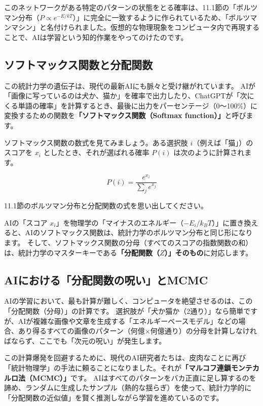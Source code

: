 このネットワークがある特定のパターンの状態をとる確率は、11.1節の「ボルツマン分布（\(P \propto e^{-E/kT}\)）」に完全に一致するように作られているため、「ボルツマンマシン」と名付けられました。仮想的な物理現象をコンピュータ内で再現することで、AIは学習という知的作業をやってのけたのです。

\subsection{ソフトマックス関数と分配関数}

この統計力学の遺伝子は、現代の最新AIにも脈々と受け継がれています。 AIが「画像に写っているのは犬か、猫か」を確率で出力したり、ChatGPTが「次にくる単語の確率」を計算するとき、最後に出力をパーセンテージ（0〜100\%）に変換するための関数を\textbf{「ソフトマックス関数（Softmax function）」}と呼びます。

ソフトマックス関数の数式を見てみましょう。ある選択肢 \(i\)（例えば「猫」）のスコアを \(x_i\) としたとき、それが選ばれる確率 \(P(i)\) は次のように計算されます。

\[
P(i) = \frac{e^{x_i}}{\sum_j e^{x_j}}
\]

11.1節のボルツマン分布と分配関数の式を思い出してください。

AIの「スコア \(x_i\)」を物理学の「マイナスのエネルギー（\(-E_i/k_B T\)）」に置き換えると、AIのソフトマックス関数は、統計力学のボルツマン分布と同じ形になります。 そして、ソフトマックス関数の分母（すべてのスコアの指数関数の和）は、統計力学のマスターキーである\textbf{「分配関数（\(Z\)）」そのもの}に対応します。

\subsection{AIにおける「分配関数の呪い」とMCMC}

AIの学習において、最も計算が難しく、コンピュータを絶望させるのは、この「分配関数（分母）」の計算です。 選択肢が「犬か猫か（2通り）」なら簡単ですが、AIが複雑な画像や文章を生成する「エネルギーベースモデル」などの場合、あり得るすべての画像のパターン（何億×何億通り）の分母を計算しなければならず、ここでも「次元の呪い」が発生します。

この計算爆発を回避するために、現代のAI研究者たちは、皮肉なことに再び「統計物理学」の手法に頼ることになりました。それが\textbf{「マルコフ連鎖モンテカルロ法（MCMC）」}です。 AIはすべてのパターンをバカ正直に足し算するのを諦め、ランダムに生成したサンプル（熱的な揺らぎ）を使って、統計力学的に「分配関数の近似値」を賢く推測しながら学習を進めているのです。

